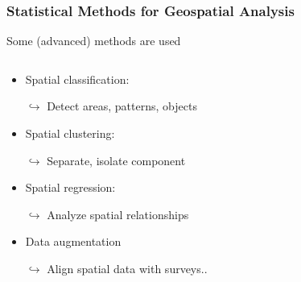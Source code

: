 \documentclass[xcolor=x11names,compress]{beamer}
\renewcommand{\(}{\begin{columns}}
\renewcommand{\)}{\end{columns}}
\newcommand{\<}[1]{\begin{column}{#1}}
\renewcommand{\>}{\end{column}}
\begin{document}
\begin{frame}
    \frametitle{Statistical Methods for Geospatial Analysis}
Some (advanced) methods are used
    \begin{columns}[T]
        \begin{column}{0.6\textwidth}
            \begin{itemize}[<+->]
            \item Spatial classification:
            \item[$\hookrightarrow$] Detect areas, patterns, objects
            \item Spatial clustering:
            \item[$\hookrightarrow$] Separate, isolate component
            \item Spatial regression:
            \item[$\hookrightarrow$] Analyze spatial relationships
            \item Data augmentation
            \item[$\hookrightarrow$] Align spatial data with surveys..


\end{itemize}
\end{column}
\end{columns}
\end{frame}
\end{document}

